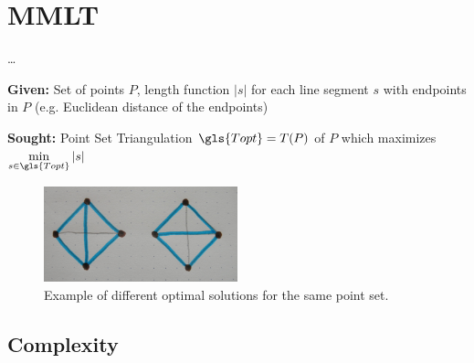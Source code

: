 \chapter{\texorpdfstring{\glsdesc{MMLT}}{MMLT}}\label{cha:mmlt}
\ldots{}



\begin{problem}
  \label{prob:mmlt}\hfill
  \begin{labeling}{\hspace{4em}}
    \item[\textbf{Given:}]
      Set of points \(P\), length function \(|s|\)
      for each line segment \(s\) with endpoints in \(P\)
      (e.g. Euclidean distance of the endpoints)
    \item[\textbf{Sought:}]
      Point Set Triangulation \(\gls{Topt} = T(P)\) of \(P\)
      which maximizes \(\min\limits_{s\in \gls{Topt}} |s|\)
  \end{labeling}
\end{problem}


\begin{figure}[ht]
  \centering
  \includegraphics[width=0.5\textwidth]{img/non_unique_optimal.jpg}
  \caption{Example of different optimal solutions for the same point set.\label{fig:non_unique_optimal}}
\end{figure}

\section{Complexity}

